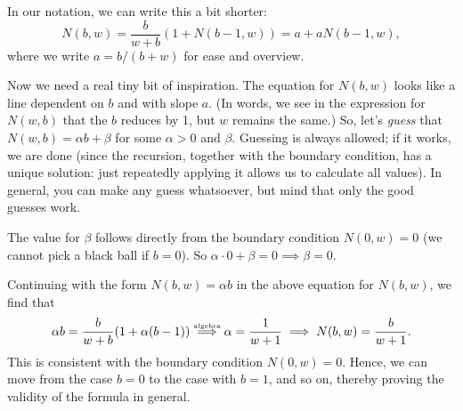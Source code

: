 \begin{exercise}
\begin{solution}
In our notation, we can write this a bit shorter:
\begin{equation}\label{eq:2}
N(b,w) = \frac{b}{w+b} (1+N(b-1, w)) = a + a N(b-1, w),
\end{equation}
where we write $a=b/(b+w)$ for ease and overview.


Now we need a real tiny bit of inspiration.
The equation for $N(b,w)$ looks like a line dependent on $b$ and with slope $a$. (In words, we see in the expression for $N(w, b)$ that the $b$ reduces by 1, but $w$ remains the same.)
So, let's \emph{guess} that $N(w,b)=\alpha b + \beta$ for some $\alpha>0$ and $\beta$.
Guessing is always allowed; if it works, we are done (since the recursion, together with the boundary condition, has a unique solution: just repeatedly applying it allows us to calculate all values).
In general, you can make any guess whatsoever, but mind that only the good guesses work.

The value for $\beta$ follows directly from the boundary condition $N(0, w) = 0$ (we cannot pick a black ball if $b=0$). So $\alpha \cdot 0 + \beta = 0 \implies \beta = 0$.

Continuing with the form $N(b, w) = \alpha b$ in the above equation for $N(b,w)$, we find that
\begin{equation*}
\alpha b = \frac{b}{w+b} (1+ \alpha (b-1)) \stackrel{\textrm{\tiny algebra}}{\implies} \alpha = \frac{1}{w+1} \implies  N(b,w) = \frac{b }{w+1}.
\end{equation*}
This is consistent with the boundary condition $N(0,w)=0$.
Hence, we can move from the case $b=0$ to the case with $b=1$, and so on, thereby proving the validity of the formula in general.
\end{solution}
\end{exercise}


